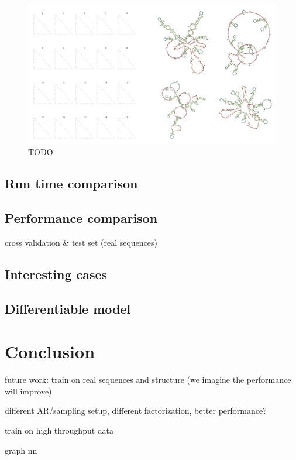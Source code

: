 \documentclass{article}
\begin{document}
\begin{figure}[h!]
    \centering
    \includegraphics[width=\textwidth]{plot/sampled_structures.png}
    \caption{TODO}
    \label{fig:sampled_structures}
    \centering
\end{figure}




\subsection{Run time comparison}

\subsection{Performance comparison}

cross validation & test set (real sequences)

\subsection{Interesting cases}

\subsection{Differentiable model}




\section{Conclusion}

future work: train on real sequences and structure (we imagine the performance will improve)

different AR/sampling setup, different factorization, better performance?

train on high throughput data

graph nn



\clearpage




%
%
%
\end{document}
